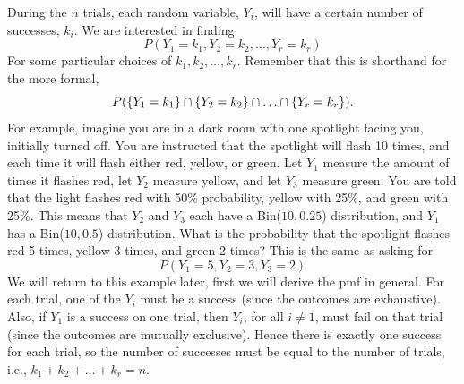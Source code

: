 \noindent During the $n$ trials, each random variable, $Y_i$, will have a certain number of successes, $k_i$. We are interested in finding
\[
P(Y_1 = k_1, Y_2 = k_2, \ldots, Y_r = k_r)
\]
For some particular choices of $k_1, k_2, \ldots, k_r$. Remember that this is shorthand for the more formal,
\[
P(\left\{Y_1 = k_1\right\} \cap \left\{Y_2 = k_2\right\} \cap \ldots \cap \left\{Y_r = k_r\right\}).
\]
For example, imagine you are in a dark room with one spotlight facing you, initially turned off. You are instructed that the spotlight will flash 10 times, and each time it will flash either red, yellow, or green. Let $Y_1$ measure the amount of times it flashes red, let $Y_2$ measure yellow, and let $Y_3$ measure green. You are told that the light flashes red with 50\% probability, yellow with 25\%, and green with 25\%. This means that $Y_2$ and $Y_3$ each have a Bin($10,0.25$) distribution, and $Y_1$ has a Bin($10,0.5$) distribution. What is the probability that the spotlight flashes red 5 times, yellow 3 times, and green 2 times? This is the same as asking for
\[
P(Y_1 = 5, Y_2 = 3, Y_3 = 2)
\]
We will return to this example later, first we will derive the pmf in general. For each trial, one of the $Y_i$ must be a success (since the outcomes are exhaustive). Also, if $Y_1$ is a success on one trial, then $Y_i$, for all $i \neq 1$, must fail on that trial (since the outcomes are mutually exclusive). Hence there is exactly one success for each trial, so the number of successes must be equal to the number of trials, i.e., $k_1 + k_2 + \ldots + k_r = n$. \\

